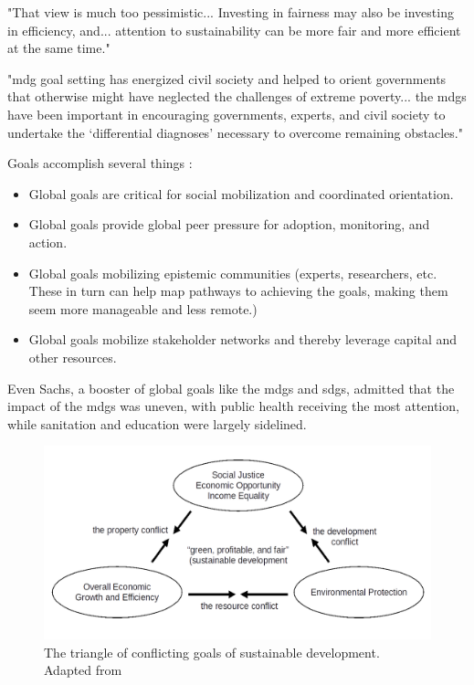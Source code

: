 "That view is much too pessimistic... Investing in fairness may also be investing in efficiency, and... attention to sustainability can be more fair and more efficient at the same time." \cite{sachsAgeSustainableDevelopment2015}

"\ac{mdg} goal setting has energized civil society and helped to orient governments that otherwise might have neglected the challenges of extreme poverty... the \acp{mdg} have been important in encouraging governments, experts, and civil society to undertake the `differential diagnoses' necessary to overcome remaining obstacles." \cite{sachsAgeSustainableDevelopment2015}

Goals accomplish several things \cite{sachsAgeSustainableDevelopment2015}:

\begin{itemize}
    \setlength{\itemsep}{0pt}%
    \setlength{\parskip}{0pt}%
	\item{Global goals are critical for social mobilization and coordinated orientation.}
	\item{Global goals provide global peer pressure for adoption, monitoring, and action.}
	\item{Global goals mobilizing epistemic communities (experts, researchers, etc. These in turn can help map pathways to achieving the goals, making them seem more manageable and less remote.)}
	\item{Global goals mobilize stakeholder networks and thereby leverage capital and other resources.}
\end{itemize}

Even Sachs, a booster of global goals like the \acp{mdg} and \acp{sdg}, admitted that the impact of the \acp{mdg} was uneven, with public health receiving the most attention, while sanitation and education were largely sidelined. \cite{sachsAgeSustainableDevelopment2015}

\begin{figure}[h]
	\centering
	\includegraphics[scale=0.35]{Figures/chap2/sustainable_triangle.png}
	\caption[The triangle of conflicting goals of sustainable development]{The triangle of conflicting goals of sustainable development. Adapted from \cite{campbellGreenCitiesGrowing2016}}
	\label{fig:sustainable_triangle}
\end{figure}

